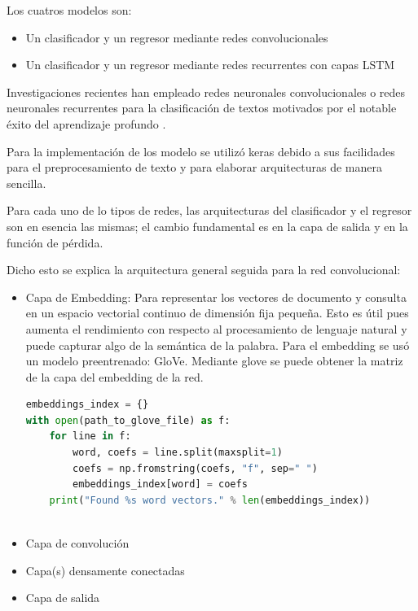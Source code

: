 \documentclass[12pt]{article}
\begin{document}
Los cuatros modelos son:
\begin{itemize}
	\item Un clasificador y un regresor mediante redes convolucionales
	\item Un clasificador y un regresor mediante redes recurrentes con capas LSTM
\end{itemize}

Investigaciones recientes han empleado redes neuronales convolucionales o redes neuronales recurrentes para la clasificación de textos motivados por el notable éxito del aprendizaje profundo \cite{wu2017convolutional}.


Para la implementaci\'on de los modelo se utiliz\'o keras debido a sus facilidades para el preprocesamiento de texto y para elaborar arquitecturas de manera sencilla.

Para cada uno de lo tipos de redes, las arquitecturas del clasificador y el regresor son en esencia las mismas; el cambio fundamental es en la capa de salida y en la funci\'on de p\'erdida.

Dicho esto se explica la arquitectura general seguida para la red convolucional:
\begin{itemize}
	\item Capa de Embedding: Para representar los vectores de documento y consulta en un espacio vectorial continuo de dimensi\'on fija peque\~na. Esto es \'util pues aumenta el rendimiento con respecto al procesamiento de lenguaje natural y puede capturar algo de la sem\'antica de la palabra. Para el embedding se us\'o un modelo preentrenado: GloVe. Mediante glove se puede obtener la matriz de la capa del embedding de la red.
	
	 \begin{lstlisting}[frame=single, breaklines, language=Python] 
embeddings_index = {}
with open(path_to_glove_file) as f:
	for line in f:
		word, coefs = line.split(maxsplit=1)
		coefs = np.fromstring(coefs, "f", sep=" ")
		embeddings_index[word] = coefs
	print("Found %s word vectors." % len(embeddings_index))
	 
	 \end{lstlisting}
	
	\item Capa de convoluci\'on
	\item Capa(s) densamente conectadas
	\item Capa de salida
\end{itemize}
\end{document}
